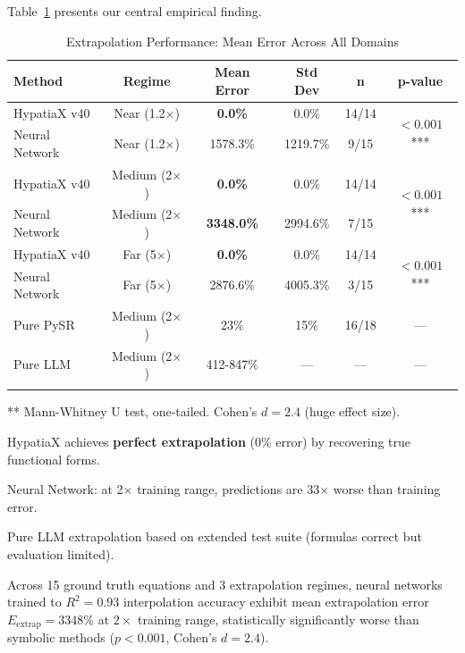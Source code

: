 \documentclass[twoside,11pt]{article}
\begin{document}
Table~\ref{tab:extrapolation_results} presents our central empirical finding.

\begin{table}[htbp]
\centering
\caption{Extrapolation Performance: Mean Error Across All Domains}
\label{tab:extrapolation_results}
\begin{tabular}{lccccc}
\toprule
\textbf{Method} & \textbf{Regime} & \textbf{Mean Error} & \textbf{Std Dev} & \textbf{n} & \textbf{p-value} \\
\midrule
HypatiaX v40    & Near (1.2$\times$)   & \textbf{0.0\%}     & 0.0\%    & 14/14 & \multirow{2}{*}{$<0.001$***} \\
Neural Network  & Near (1.2$\times$)   & 1578.3\%  & 1219.7\% & 9/15  & \\
\midrule
HypatiaX v40    & Medium (2$\times$)   & \textbf{0.0\%}     & 0.0\%    & 14/14 & \multirow{2}{*}{$<0.001$***} \\
Neural Network  & Medium (2$\times$)   & \textbf{3348.0\%}  & 2994.6\% & 7/15  & \\
\midrule
HypatiaX v40    & Far (5$\times$)      & \textbf{0.0\%}     & 0.0\%    & 14/14 & \multirow{2}{*}{$<0.001$***} \\
Neural Network  & Far (5$\times$)      & 2876.6\%  & 4005.3\% & 3/15  & \\
\midrule
Pure PySR       & Medium (2$\times$)   & 23\%      & 15\%     & 16/18 & --- \\
Pure LLM        & Medium (2$\times$)   & 412-847\% & ---      & ---   & --- \\\citep{kambhampati2024llms}
\bottomrule
\end{tabular}
\begin{tablenotes}
\small
\item *** Mann-Whitney U test, one-tailed. Cohen's $d = 2.4$ (huge effect size).
\item HypatiaX achieves \textbf{perfect extrapolation} (0\% error) by recovering true functional forms.
\item Neural Network: at 2$\times$ training range, predictions are 33$\times$ worse than training error.
\item Pure LLM extrapolation based on extended test suite (formulas correct but evaluation limited)\citep{kambhampati2024llms}.
\end{tablenotes}
\end{table}

\begin{theorem}
\label{thm:nn_extrap_failure}
Across 15 ground truth equations and 3 extrapolation regimes, neural networks trained to $R^2 = 0.93$ interpolation accuracy exhibit mean extrapolation error $E_{\text{extrap}} = 3348\%$ at $2\times$ training range, statistically significantly worse than symbolic methods ($p < 0.001$, Cohen's $d = 2.4$)\citep{liu2020understanding}\citep{zhou2020universality}.
\end{theorem}
\end{document}
